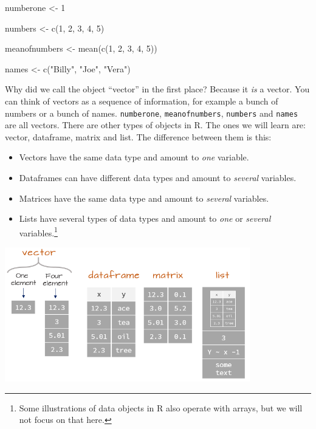 \documentclass[
]{article}
\newenvironment{Shaded}{\begin{snugshade}}{\end{snugshade}}
\newcommand{\DecValTok}[1]{\textcolor[rgb]{0.00,0.00,0.81}{#1}}
\newcommand{\FunctionTok}[1]{\textcolor[rgb]{0.00,0.00,0.00}{#1}}
\newcommand{\NormalTok}[1]{#1}
\newcommand{\OtherTok}[1]{\textcolor[rgb]{0.56,0.35,0.01}{#1}}
\newcommand{\StringTok}[1]{\textcolor[rgb]{0.31,0.60,0.02}{#1}}
\providecommand{\tightlist}{%
  \setlength{\itemsep}{0pt}\setlength{\parskip}{0pt}}
\begin{document}
\begin{Shaded}
\begin{Highlighting}[]
\NormalTok{numberone }\OtherTok{\textless{}{-}} \DecValTok{1}

\NormalTok{numbers }\OtherTok{\textless{}{-}} \FunctionTok{c}\NormalTok{(}\DecValTok{1}\NormalTok{, }\DecValTok{2}\NormalTok{, }\DecValTok{3}\NormalTok{, }\DecValTok{4}\NormalTok{, }\DecValTok{5}\NormalTok{)}

\NormalTok{meanofnumbers }\OtherTok{\textless{}{-}} \FunctionTok{mean}\NormalTok{(}\FunctionTok{c}\NormalTok{(}\DecValTok{1}\NormalTok{, }\DecValTok{2}\NormalTok{, }\DecValTok{3}\NormalTok{, }\DecValTok{4}\NormalTok{, }\DecValTok{5}\NormalTok{))}

\NormalTok{names }\OtherTok{\textless{}{-}} \FunctionTok{c}\NormalTok{(}\StringTok{"Billy"}\NormalTok{, }\StringTok{"Joe"}\NormalTok{, }\StringTok{"Vera"}\NormalTok{)}
\end{Highlighting}
\end{Shaded}

Why did we call the object ``vector'' in the first place? Because it
\emph{is} a vector. You can think of vectors as a sequence of
information, for example a bunch of numbers or a bunch of names.
\texttt{numberone}, \texttt{meanofnumbers}, \texttt{numbers} and
\texttt{names} are all vectors. There are other types of objects in R.
The ones we will learn are: vector, dataframe, matrix and list. The
difference between them is this:

\begin{itemize}
\tightlist
\item
  Vectors have the same data type and amount to \emph{one} variable.
\item
  Dataframes can have different data types and amount to \emph{several}
  variables.
\item
  Matrices have the same data type and amount to \emph{several}
  variables.
\item
  Lists have several types of data types and amount to \emph{one} or
  \emph{several} variables.\footnote{Some illustrations of data objects
    in R also operate with arrays, but we will not focus on that here.}
\end{itemize}

\includegraphics[width=0.8\textwidth,height=\textheight]{./figures/objects.png}
\end{document}
